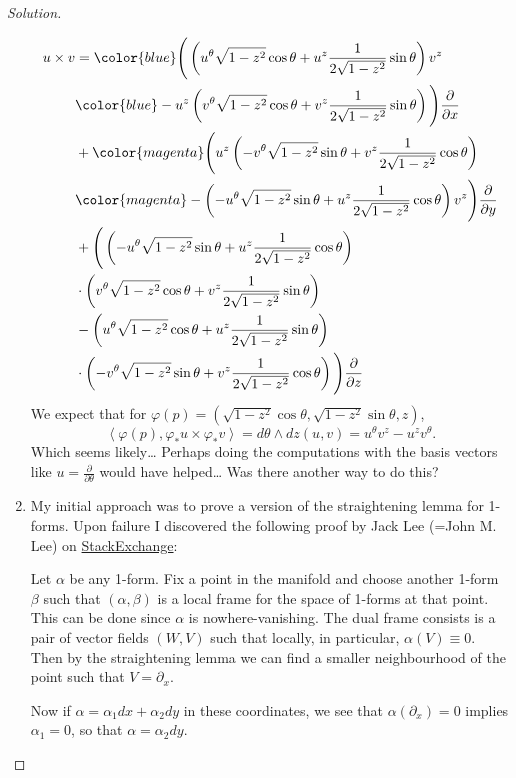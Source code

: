 \begin{proof}[Solution]
\begin{enumerate}[label=\alph*.]
\begin{align*}
				u\times v&={\color{blue}\Bigg(\left( u^\theta \sqrt{1-z^2} \cos \theta+u^z\frac{1}{2\sqrt{1-z^2} }\sin \theta \right)v^z}\\
					 &{\color{blue}-u^z\left( v^\theta \sqrt{1-z^2} \cos \theta+v^z\frac{1}{2\sqrt{1-z^2} }\sin \theta \right) \Bigg)\frac{\partial}{\partial x}}\\
					 &+{\color{magenta}\Bigg(u^z \left( -v^\theta \sqrt{1-z^2} \sin \theta+v^z\frac{1}{2\sqrt{1-z^2} }\cos \theta \right)} \\
					 &{\color{magenta}-\left( -u^\theta \sqrt{1-z^2} \sin \theta+u^z\frac{1}{2\sqrt{1-z^2} }\cos \theta \right) v^z\Bigg)\frac{\partial}{\partial y}}\\
				&+\Bigg(\left( -u^\theta \sqrt{1-z^2} \sin \theta+u^z\frac{1}{2\sqrt{1-z^2} }\cos \theta \right)\\
				&\cdot \left( v^\theta \sqrt{1-z^2} \cos \theta+v^z\frac{1}{2\sqrt{1-z^2} }\sin \theta \right)\\
				&-\left( u^\theta \sqrt{1-z^2} \cos \theta+u^z\frac{1}{2\sqrt{1-z^2} }\sin \theta \right)\\
				&\cdot \left( -v^\theta \sqrt{1-z^2} \sin \theta+v^z\frac{1}{2\sqrt{1-z^2} }\cos \theta \right)\Bigg)\frac{\partial}{\partial z}
			\end{align*}
			We expect that for $\varphi (p)=(\sqrt{1-z^2} \cos \theta,\sqrt{1-z^2} \sin \theta,z)$,
			\[\left<\varphi(p),\varphi_*u\times \varphi_*v\right>=d\theta\wedge dz(u,v)=u^\theta v^z-u^zv^\theta. \]
			Which seems likely… Perhaps doing the computations with the basis vectors like $u=\frac{\partial}{\partial \theta}$ would have helped… Was there another way to do this?

	\item My initial approach was to prove a version of the straightening lemma for 1-forms. Upon failure I discovered the following proof by Jack Lee (=John M. Lee) on \href{https://math.stackexchange.com/questions/1071490/local-expression-for-a-1-form-on-a-surface}{StackExchange}:

		Let $\alpha$ be any 1-form. Fix a point in the manifold and choose another 1-form $\beta$ such that $(\alpha,\beta)$ is a local frame for the space of 1-forms at that point. This can be done since $\alpha$ is nowhere-vanishing. The dual frame consists is a pair of vector fields $(W,V)$ such that locally, in particular, $\alpha(V)\equiv0$. Then by the straightening lemma we can find a smaller neighbourhood of the point such that $V=\partial_x$.

		Now if $\alpha=\alpha_1dx+\alpha_2dy$ in these coordinates, we see that $\alpha(\partial_x)=0$ implies $\alpha_1=0$, so that $\alpha=\alpha_2dy$.


\end{enumerate}
\end{proof}
